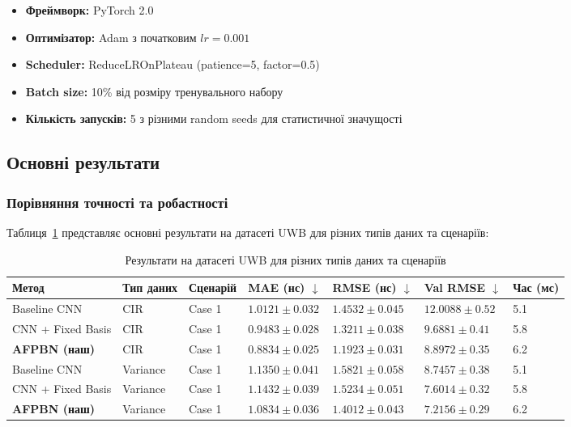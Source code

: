 \documentclass[12pt,a4paper]{article}
\begin{document}
\begin{itemize}
	\item \textbf{Фреймворк:} PyTorch 2.0
	\item \textbf{Оптимізатор:} Adam з початковим $lr = 0.001$
	\item \textbf{Scheduler:} ReduceLROnPlateau (patience=5, factor=0.5)
	\item \textbf{Batch size:} 10\% від розміру тренувального набору
	\item \textbf{Кількість запусків:} 5 з різними random seeds для статистичної значущості
\end{itemize}

\subsection{Основні результати}

\subsubsection{Порівняння точності та робастності}

Таблиця~\ref{tab:main_results} представляє основні результати на датасеті UWB для різних типів даних та сценаріїв:

\begin{table}[htbp]
	\centering
	\caption{Результати на датасеті UWB для різних типів даних та сценаріїв}
	\label{tab:main_results}
	\begin{tabular}{@{}p{2.5cm}p{2cm}p{1.8cm}p{2.2cm}p{2.2cm}p{2.2cm}p{1.5cm}@{}}
		\toprule
		\textbf{Метод} & \textbf{Тип даних} & \textbf{Сценарій} & \textbf{MAE (нс)} $\downarrow$ & \textbf{RMSE (нс)} $\downarrow$ & \textbf{Val RMSE} $\downarrow$ & \textbf{Час (мс)} \\
		\midrule
		Baseline CNN & CIR & Case 1 & $1.0121 \pm 0.032$ & $1.4532 \pm 0.045$ & $12.0088 \pm 0.52$ & 5.1 \\
		CNN + Fixed Basis & CIR & Case 1 & $0.9483 \pm 0.028$ & $1.3211 \pm 0.038$ & $9.6881 \pm 0.41$ & 5.8 \\
		\textbf{AFPBN (наш)} & CIR & Case 1 & $\mathbf{0.8834 \pm 0.025}$ & $\mathbf{1.1923 \pm 0.031}$ & $\mathbf{8.8972 \pm 0.35}$ & 6.2 \\
		\midrule
		Baseline CNN & Variance & Case 1 & $1.1350 \pm 0.041$ & $1.5821 \pm 0.058$ & $8.7457 \pm 0.38$ & 5.1 \\
		CNN + Fixed Basis & Variance & Case 1 & $1.1432 \pm 0.039$ & $1.5234 \pm 0.051$ & $7.6014 \pm 0.32$ & 5.8 \\
		\textbf{AFPBN (наш)} & Variance & Case 1 & $\mathbf{1.0834 \pm 0.036}$ & $\mathbf{1.4012 \pm 0.043}$ & $\mathbf{7.2156 \pm 0.29}$ & 6.2 \\
		\bottomrule
	\end{tabular}
\end{table}
\end{document}
